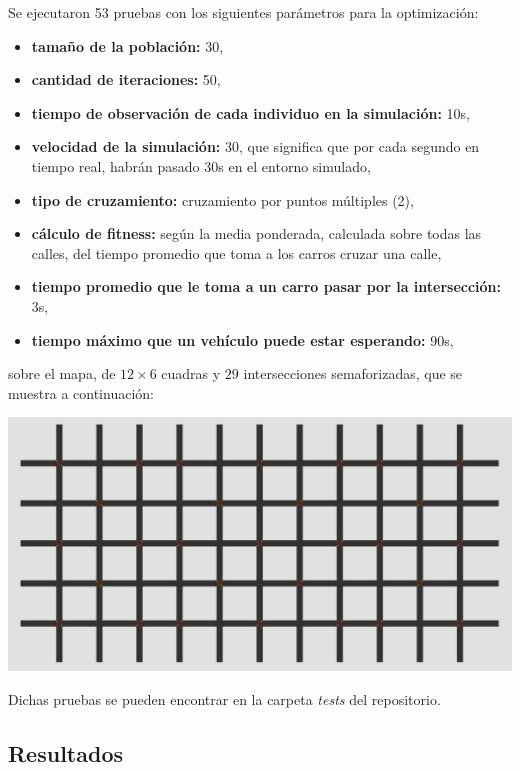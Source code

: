 \documentclass[colorinlistoftodos,twoside,twocolumn]{article} %
\begin{document}
	Se ejecutaron 53 pruebas con los siguientes par\'ametros para la optimizaci\'on:
	\begin{itemize}
		\item \textbf{tama\~no de la poblaci\'on:} 30,
		\item \textbf{cantidad de iteraciones:} 50,
		\item \textbf{tiempo de observaci\'on de cada individuo en la simulaci\'on:} 10s,
		\item \textbf{velocidad de la simulaci\'on:} 30, que significa que por cada segundo en tiempo real, habr\'an pasado 30s en el entorno simulado,
		\item \textbf{tipo de cruzamiento:} cruzamiento por puntos m\'ultiples (2),
		\item \textbf{c\'alculo de fitness:} seg\'un la media ponderada, calculada sobre todas las calles, del tiempo promedio que toma a los carros cruzar una calle,
		\item \textbf{tiempo promedio que le toma a un carro pasar por la intersección:} 3s,
		\item \textbf{tiempo máximo que un vehículo puede estar esperando:} 90s,
	\end{itemize}
	sobre el mapa, de $ 12 \times 6 $ cuadras y $ 29 $ intersecciones semaforizadas, que se muestra a continuaci\'on:
	
	\begin{center}
		\includegraphics[width=\columnwidth]{map.jpg}
	\end{center}
	
	Dichas pruebas se pueden encontrar en la carpeta \emph{tests} del repositorio. 

	\subsection{Resultados}
	
\end{document}
